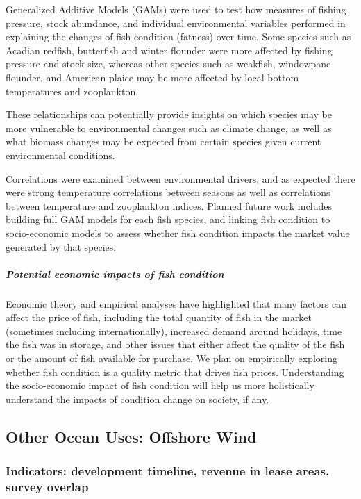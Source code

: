 \documentclass[
  10pt,
]{article}
\begin{document}
Generalized Additive Models (GAMs) were used to test how measures of
fishing pressure, stock abundance, and individual environmental
variables performed in explaining the changes of fish condition
(fatness) over time. Some species such as Acadian redfish, butterfish
and winter flounder were more affected by fishing pressure and stock
size, whereas other species such as weakfish, windowpane flounder, and
American plaice may be more affected by local bottom temperatures and
zooplankton.

These relationships can potentially provide insights on which species
may be more vulnerable to environmental changes such as climate change,
as well as what biomass changes may be expected from certain species
given current environmental conditions.

Correlations were examined between environmental drivers, and as
expected there were strong temperature correlations between seasons as
well as correlations between temperature and zooplankton indices.
Planned future work includes building full GAM models for each fish
species, and linking fish condition to socio-economic models to assess
whether fish condition impacts the market value generated by that
species.

\hypertarget{potential-economic-impacts-of-fish-condition}{%
\subparagraph{\texorpdfstring{\emph{Potential economic impacts of fish
condition}}{Potential economic impacts of fish condition}}\label{potential-economic-impacts-of-fish-condition}}

Economic theory and empirical analyses have highlighted that many
factors can affect the price of fish, including the total quantity of
fish in the market (sometimes including internationally), increased
demand around holidays, time the fish was in storage, and other issues
that either affect the quality of the fish or the amount of fish
available for purchase. We plan on empirically exploring whether fish
condition is a quality metric that drives fish prices. Understanding the
socio-economic impact of fish condition will help us more holistically
understand the impacts of condition change on society, if any.

\hypertarget{other-ocean-uses-offshore-wind}{%
\subsection{Other Ocean Uses: Offshore
Wind}\label{other-ocean-uses-offshore-wind}}

\hypertarget{indicators-development-timeline-revenue-in-lease-areas-survey-overlap}{%
\subsubsection{Indicators: development timeline, revenue in lease areas,
survey
overlap}\label{indicators-development-timeline-revenue-in-lease-areas-survey-overlap}}
\end{document}
